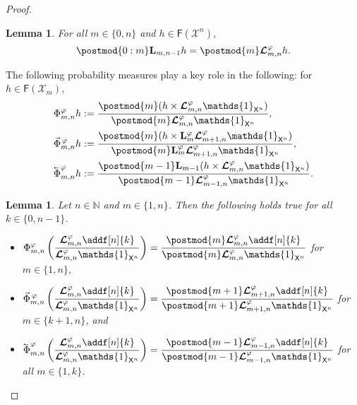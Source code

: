 \documentclass{article}
\newtheorem{lemma}[theorem]{Lemma}
\newcommand{\Xfd}{\mathcal{X}}
\newcommand{\cev}[1]{\reflectbox{\ensuremath{\vec{\reflectbox{\ensuremath{#1}}}}}}
\newcommand{\ukmod}[1]{\mathbf{L}_{#1}^\precpar}
\newcommand{\shiftbwd}{\cev{\shiftsymbol}^{\precpar}}
\newcommand{\shiftfwd}{\vec{\shiftsymbol}^{\, \precpar}}
\newcommand{\shiftsymbol}{\Phi}
\newcommand{\precpar}{\varphi}
\newcommand{\intvect}[2]{\{ #1, #2 \}}
\newcommand{\noshift}{\shiftsymbol^{\precpar}}
\newcommand{\nset}{\mathbb{N}}
\newcommand{\1}{\mathbbm{1}}
\newcommand{\retrokmod}{\boldsymbol{\mathcal{L}}^\precpar}
\newcommand{\uk}[1]{\mathbf{L}_{#1}}
\newcommand{\Xset}{\mathsf{X}}
\newcommand{\bmf}[1]{\set{F}(#1)}
\newcommand{\set}[1]{\mathsf{#1}}
\def\1{\mathds{1}}
\newcommand{\eqdef}{\ensuremath{:=}}
\begin{document}
\begin{proof}
\begin{lemma} \label{lem:retro:prospective:id}
For all $m \in \intvect{0}{n}$ and $h \in \bmf{\Xfd^n}$, 
\begin{equation} \label{eq:retro:prospective:id}
\postmod{0:m} \uk{m, n - 1} h = \postmod{m} \retrokmod_{m, n} h.  
\end{equation}
\end{lemma}
The following probability measures play a key role in the following: for $h \in \bmf{\Xfd_m}$, 
\begin{align}
\noshift_{m, n} h &\eqdef \frac{\postmod{m} (h \times \retrokmod_{m, n} \1_{\Xset^n})}{\postmod{m} \retrokmod_{m, n} \1_{\Xset^n}}, \nonumber \\
\shiftfwd_{m, n} h &\eqdef \frac{\postmod{m} (h \times \ukmod{m} \retrokmod_{m + 1, n} \1_{\Xset^n})}{\postmod{m} \ukmod{m} \retrokmod_{m + 1, n} \1_{\Xset^n}}, \nonumber \\
\shiftbwd_{m, n} h &\eqdef \frac{\postmod{m - 1} \uk{m - 1}(h \times \retrokmod_{m, n} \1_{\Xset^n})}{\postmod{m - 1} \retrokmod_{m - 1, n} \1_{\Xset^n}}.  \nonumber 
\end{align}


\begin{lemma} \label{lemma:three:identities}
Let $n \in \nset$ and $m \in \intvect{1}{n}$. Then the following holds true for all $k \in \intvect{0}{n - 1}$. 
\begin{itemize}
\item[(i)]  
$
\displaystyle \noshift_{m, n} \left( \frac{\retrokmod_{m, n} \addf[n]{k}}{\retrokmod_{m, n} \1_{\Xset^n}} \right) = \frac{\postmod{m} \retrokmod_{m, n} \addf[n]{k}}{\postmod{m} \retrokmod_{m, n} \1_{\Xset^n}}$ \quad for $m \in \intvect{1}{n}$, 
\item[(ii)]  
$
\displaystyle \shiftfwd_{m, n} \left( \frac{\retrokmod_{m, n} \addf[n]{k}}{\retrokmod_{m, n} \1_{\Xset^n}} \right) = \frac{\postmod{m + 1} \retrokmod_{m + 1, n} \addf[n]{k}}{\postmod{m + 1} \retrokmod_{m + 1, n} \1_{\Xset^n}}
$ \quad for $m \in \intvect{k + 1}{n}$, and 
\item[(iii)] 
$
\displaystyle \shiftbwd_{m, n} \left( \frac{\retrokmod_{m, n} \addf[n]{k}}{\retrokmod_{m, n} \1_{\Xset^n}} \right) = \frac{\postmod{m - 1} \retrokmod_{m - 1, n} \addf[n]{k}}{\postmod{m - 1} \retrokmod_{m - 1, n} \1_{\Xset^n}}
$ \quad for all $m \in \intvect{1}{k}$. 
\end{itemize}
\end{lemma}


\end{proof}
\end{document}
